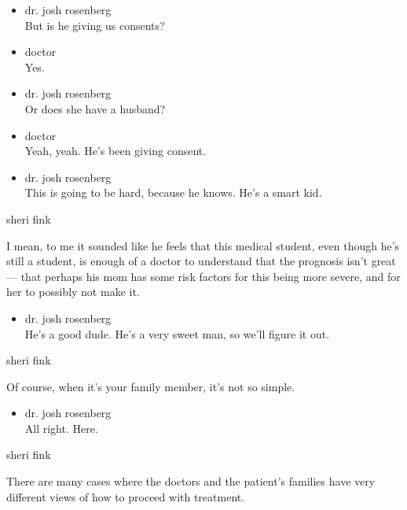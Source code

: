 \begin{itemize}
\item
  dr. josh rosenberg\\
  But is he giving us consents?
\item
  doctor\\
  Yes.
\item
  dr. josh rosenberg\\
  Or does she have a husband?
\item
  doctor\\
  Yeah, yeah. He's been giving consent.
\item
  dr. josh rosenberg\\
  This is going to be hard, because he knows. He's a smart kid.
\end{itemize}

sheri fink

I mean, to me it sounded like he feels that this medical student, even
though he's still a student, is enough of a doctor to understand that
the prognosis isn't great --- that perhaps his mom has some risk factors
for this being more severe, and for her to possibly not make it.

\begin{itemize}
\tightlist
\item
  dr. josh rosenberg\\
  He's a good dude. He's a very sweet man, so we'll figure it out.
\end{itemize}

sheri fink

Of course, when it's your family member, it's not so simple.

\begin{itemize}
\tightlist
\item
  dr. josh rosenberg\\
  All right. Here.
\end{itemize}

sheri fink

There are many cases where the doctors and the patient's families have
very different views of how to proceed with treatment.

